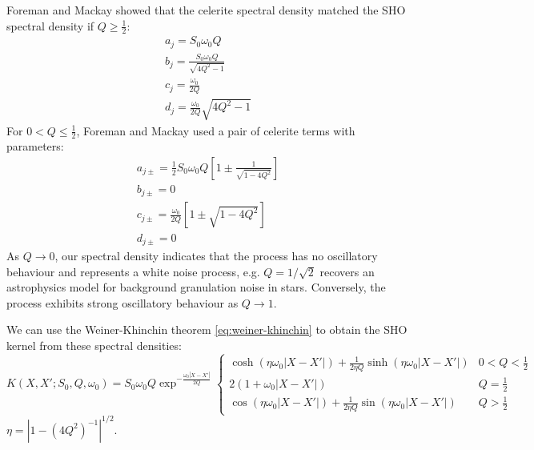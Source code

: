 Foreman and Mackay \cite{foreman-mackay} showed that the celerite spectral density matched the SHO spectral density if $Q \geq \frac{1}{2}$:
\begin{equation*}
    \begin{aligned}
        a_j = S_0 \omega_0 Q \\
        b_j = \frac{S_0 \omega_0 Q}{\sqrt{4Q^2 - 1}} \\
        c_j = \frac{\omega_0}{2Q} \\
        d_j = \frac{\omega_0}{2Q} \sqrt{4Q^2 - 1}
    \end{aligned}
\end{equation*}
For $0 < Q \leq \frac{1}{2}$, Foreman and Mackay \cite{foreman-mackay} used a pair of celerite terms with parameters:
\begin{equation*}
    \begin{aligned}
        a_{j \pm} = \frac{1}{2} S_0 \omega_0 Q \left[ 1 \pm \frac{1}{\sqrt{1 - 4Q^2}} \right] \\
        b_{j \pm} = 0 \\
        c_{j \pm} = \frac{\omega_0}{2Q} \left[ 1 \pm \sqrt{1 - 4Q^2} \right] \\
        d_{j \pm} = 0
    \end{aligned}
\end{equation*}
As $Q \to 0$, our spectral density indicates that the process has no oscillatory behaviour and represents a white noise process, e.g. $Q = 1 / \sqrt{2}$ recovers an astrophysics model \cite{sho-noise-astro} for background granulation noise in stars. Conversely, the process exhibits strong oscillatory behaviour as $Q \to 1$. 

We can use the Weiner-Khinchin theorem \ref{eq:weiner-khinchin} to obtain the SHO kernel from these spectral densities:
\begin{equation*}
    K(X, X'; S_0, Q, \omega_0) = S_0 \omega_0 Q \exp^{-\frac{\omega_0 |X - X'|}{2Q}} \begin{cases}
            \cosh (\eta \omega_0 |X - X'|) + \frac{1}{2 \eta Q} \sinh ( \eta \omega_0 |X - X'|) & 0 < Q < \frac{1}{2} \\
            2(1 + \omega_0 |X - X'|) & Q = \frac{1}{2} \\
            \cos (\eta \omega_0 |X - X'|) + \frac{1}{2 \eta Q} \sin ( \eta \omega_0 |X - X'|) & Q > \frac{1}{2}
    \end{cases}
\end{equation*}
$\eta = |1 - (4Q^2)^{-1} |^{1/2}$. 

